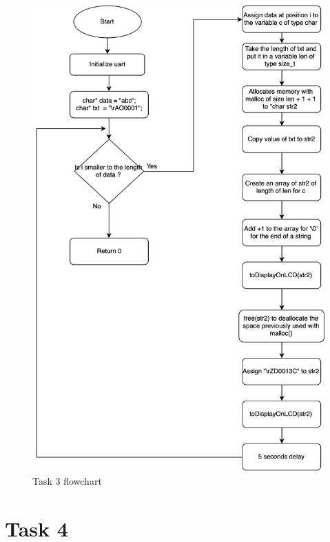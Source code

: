 \documentclass[a4paper,12pt]{article}
\begin{document}
\begin{figure}
\begin{center}
\includegraphics[width=\textwidth/4 ]{flowchart/task3_flowchart.png}
\end{center}
\caption{Task 3 flowchart}
\label{task3}
\end{figure}

\break

\section{Task 4}

\lstset{style=Asm}
\end{document}
